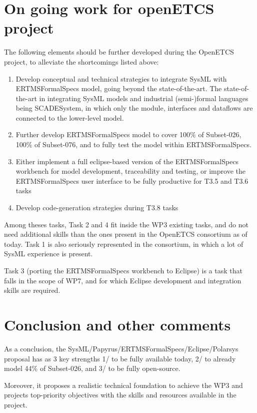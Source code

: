 \section{On going work for openETCS project}

The following elements should be further developed during the OpenETCS project, to alleviate the shortcomings listed above:

\begin{enumerate}
  \item Develop conceptual and technical strategies to integrate SysML with ERTMSFormalSpecs model, going beyond the state-of-the-art. The state-of-the-art in integrating SysML models and industrial (semi-)formal languages being SCADESystem, in which only the module, interfaces and dataflows are connected to the lower-level model.
	\item Further develop ERTMSFormalSpecs model to cover 100\% of Subset-026, 100\% of Subset-076, and to fully test the model within ERTMSFormalSpecs. 
	\item Either implement a full eclipse-based version of the ERTMSFormalSpecs workbench for model development, traceability and testing, or improve the ERTMSFormalSpecs user interface to be fully productive for T3.5 and T3.6 tasks
	\item Develop code-generation strategies during T3.8 tasks
\end{enumerate}

Among theses tasks, Task 2 and 4 fit inside the WP3 existing tasks, and do not need additional skills than the ones present in the OpenETCS consortium as of today. Task 1 is also seriously represented in the consortium, in which a lot of SysML experience is present. 

Task 3 (porting the ERTMSFormalSpecs workbench to Eclipse) is a task that falls in the scope of WP7, and for which Eclipse development and integration skills are required.

\section{Conclusion and other comments}

As a conclusion, the SysML/Papyrus/ERTMSFormalSpecs/Eclipse/Polarsys proposal has as 3 key strengths 1/ to be fully available today, 2/ to already model 44\% of Subset-026, and 3/ to be fully open-source. 

Moreover, it proposes a realistic technical foundation to achieve the WP3 and projects top-priority objectives with the skills and resources available in the project.
